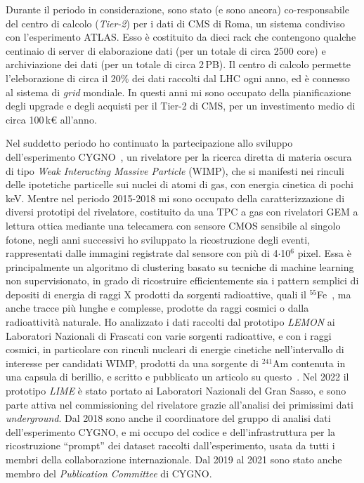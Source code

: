 \documentclass[a4paper,12pt,twoside]{article}
\begin{document}
{  Durante il periodo in considerazione, sono stato (e sono ancora)
  co-responsabile del centro di calcolo (\textit{Tier-2}) per i dati
  di CMS di Roma, un sistema condiviso con l'esperimento ATLAS. Esso
  \`e costituito da dieci rack che contengono qualche centinaio di
  server di elaborazione dati (per un totale di circa 2500 core) e
  archiviazione dei dati (per un totale di circa 2\,PB). Il centro di
  calcolo permette l'eleborazione di circa il 20\% dei dati raccolti
  dal LHC ogni anno, ed \`e connesso al sistema di \textit{grid}
  mondiale. In questi anni mi sono occupato della pianificazione degli
  upgrade e degli acquisti per il Tier-2 di CMS, per un investimento
  medio di circa 100\,k\euro{} all'anno.

  Nel suddetto periodo ho continuato la partecipazione allo sviluppo
  dell'esperimento CYGNO~, un rivelatore per la
  ricerca diretta di materia oscura di tipo \textit{Weak Interacting
    Massive Particle} (WIMP), che si manifesti nei rinculi delle
  ipotetiche particelle sui nuclei di atomi di gas, con energia
  cinetica di pochi keV. Mentre nel periodo 2015-2018 mi sono occupato
  della caratterizzazione di diversi prototipi del rivelatore,
  costituito da una TPC a gas con rivelatori GEM a lettura ottica
  mediante una telecamera con sensore CMOS sensibile al singolo
  fotone, negli anni successivi ho sviluppato la ricostruzione degli
  eventi, rappresentati dalle immagini registrate dal sensore con
  pi\`u di 4$\cdot$10$^6$ pixel.  Essa \`e principalmente un algoritmo
  di clustering basato su tecniche di machine learning non
  supervisionato, in grado di ricostruire efficientemente sia i
  pattern semplici di depositi di energia di raggi X prodotti da
  sorgenti radioattive, quali il $^{55}$Fe~, ma
  anche tracce pi\`u lunghe e complesse, prodotte da raggi cosmici o
  dalla radioattivit\`a naturale. Ho analizzato i dati raccolti dal
  prototipo {\it LEMON} ai Laboratori Nazionali di Frascati con varie
  sorgenti radioattive, e con i raggi cosmici, in particolare con
  rinculi nucleari di energie cinetiche nell'intervallo di interesse
  per candidati WIMP, prodotti da una sorgente di $^{241}$Am contenuta
  in una capsula di berillio, e scritto e pubblicato un articolo su
  questo~.  Nel 2022 il prototipo {\it
    LIME} \`e stato portato ai Laboratori Nazionali del Gran Sasso, e
  sono parte attiva nel commissioning del rivelatore grazie
  all'analisi dei primissimi dati {\it underground}.  Dal 2018 sono
  anche il coordinatore del gruppo di analisi dati dell'esperimento
  CYGNO, e mi occupo del codice e dell'infrastruttura per la
  ricostruzione ``prompt'' dei dataset raccolti dall'esperimento,
  usata da tutti i membri della collaborazione internazionale. Dal
  2019 al 2021 sono stato anche membro del \textit{Publication
    Committee} di CYGNO.

}
\end{document}
